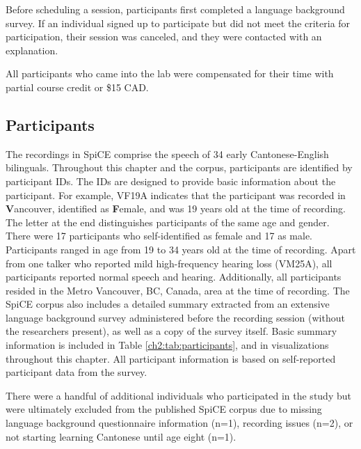 Before scheduling a session, participants first completed a language background survey. If an individual signed up to participate but did not meet the criteria for participation, their session was canceled, and they were contacted with an explanation.

All participants who came into the lab were compensated for their time with partial course credit or \$15 CAD. 

\subsection{Participants}\label{ch2:subsec:participants} 
The recordings in SpiCE comprise the speech of 34 early Cantonese-English bilinguals. Throughout this chapter and the corpus, participants are identified by participant IDs. The IDs are designed to provide basic information about the participant. For example, VF19A indicates that the participant was recorded in \textbf{V}ancouver, identified as \textbf{F}emale, and was 19 years old at the time of recording. The letter at the end distinguishes participants of the same age and gender. There were 17 participants who self-identified as female and 17 as male. Participants ranged in age from 19 to 34 years old at the time of recording. Apart from one talker who reported mild high-frequency hearing loss (VM25A), all participants reported normal speech and hearing. Additionally, all participants resided in the Metro Vancouver, BC, Canada, area at the time of recording. The SpiCE corpus also includes a detailed summary extracted from an extensive language background survey administered before the recording session (without the researchers present), as well as a copy of the survey itself. Basic summary information is included in Table \ref{ch2:tab:participants}, and in visualizations throughout this chapter. All participant information is based on self-reported participant data from the survey.

There were a handful of additional individuals who participated in the study but were ultimately excluded from the published SpiCE corpus due to missing language background questionnaire information (n=1), recording issues (n=2), or not starting learning Cantonese until age eight (n=1).

